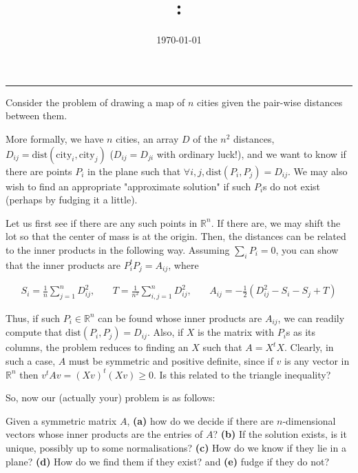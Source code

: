 \documentclass[12pt]{article}
\title{\code: \name}
\author{\me}
\date{\today}
\begin{document}
\maketitle
\hrule \bigskip

Consider the problem of drawing a map of $n$ cities given the pair-wise distances between them.\medskip

More formally, we have $n$ cities, an array $D$ of the $n^2$ distances, $D_{ij} = \text{dist}(\text{city}_i, \text{city}_j)$ ($D_{ij} = D_{ji}$ with ordinary luck!), and we want to know if there are points $P_i$ in the plane  such that $\forall i, j, \text{dist}(P_i, P_j) = D_{ij}$. We may also wish to find an appropriate "approximate solution" if such $P_i$s do not exist (perhaps by fudging it a little).\medskip

Let us first see if there are any such points in $\mathbb{R}^n$. If there are, we may shift the lot so that the center of mass is at the origin. Then, the distances can be related to the inner products in the following way. Assuming $\sum_i P_i = 0$, you can show that the inner products are $P_i^tP_j = A_{ij}$, where

\begin{align*}
	S_i = \frac{1}{n}\sum^n_{j=1}D_{ij}^2,&\ &T=\frac{1}{n^2}\sum^n_{i,j=1}D_{ij}^2,&\ &A_{ij} = -\frac{1}{2}(D_{ij}^2 - S_i - S_j + T)
\end{align*}

Thus, if such $P_i \in \mathbb{R}^n$ can be found whose inner products are $A_{ij}$, we can readily compute that $\text{dist}(P_i, P_j) = D_{ij}$. Also, if $X$ is the matrix with $P_i$s as its columns, the problem reduces to finding an $X$ such that $A = X^tX$. Clearly, in such a case, $A$ must be symmetric and positive definite, since if $v$ is any vector in $\mathbb{R}^n$ then $v^t A v = (Xv)^t(Xv) \geq 0$. Is this related to the triangle inequality?\medskip

So, now our (actually your) problem is as follows:

Given a symmetric matrix $A$, {\bf (a)} how do we decide if there are $n$-dimensional vectors whose inner products are the entries of $A$? {\bf (b)} If the solution exists, is it unique, possibly up to some normalisations? {\bf (c)} How do we know if they lie in a plane? {\bf (d)} How do we find them if they exist? and {\bf (e)} fudge if they do not?\bigskip
\end{document}
